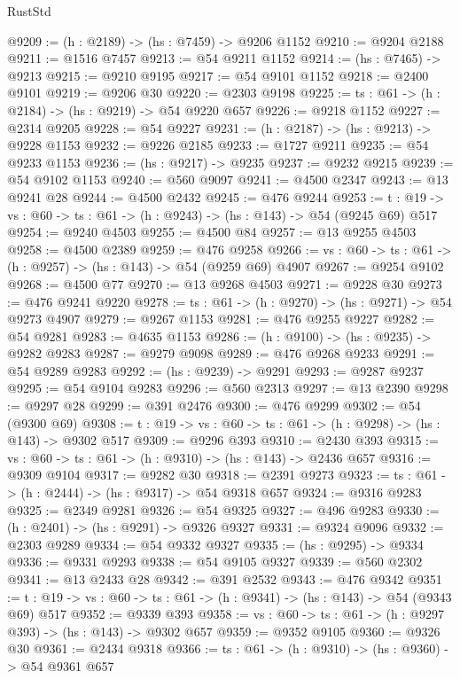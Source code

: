 \begin{lexlean}{RustStd}
\begin{coremodule}
@9209 := (h : @2189) -> (hs : @7459) -> @9206 @1152
@9210 := @9204 @2188
@9211 := @1516 @7457
@9213 := @54 @9211 @1152
@9214 := (hs : @7465) -> @9213
@9215 := @9210 @9195
@9217 := @54 @9101 @1152
@9218 := @2400 @9101
@9219 := @9206 @30
@9220 := @2303 @9198
@9225 := {ts : @61} -> (h : @2184) -> (hs : @9219) -> @54 @9220 @657
@9226 := @9218 @1152
@9227 := @2314 @9205
@9228 := @54 @9227
@9231 := (h : @2187) -> (hs : @9213) -> @9228 @1153
@9232 := @9226 @2185
@9233 := @1727 @9211
@9235 := @54 @9233 @1153
@9236 := (hs : @9217) -> @9235
@9237 := @9232 @9215
@9239 := @54 @9102 @1153
@9240 := @560 @9097
@9241 := @4500 @2347
@9243 := @13 @9241 @28
@9244 := @4500 @2432
@9245 := @476 @9244
@9253 := {t : @19} -> {vs : @60} -> {ts : @61} -> (h : @9243) -> (hs : @143) -> @54 (@9245 @69) @517
@9254 := @9240 @4503
@9255 := @4500 @84
@9257 := @13 @9255 @4503
@9258 := @4500 @2389
@9259 := @476 @9258
@9266 := {vs : @60} -> {ts : @61} -> (h : @9257) -> (hs : @143) -> @54 (@9259 @69) @4907
@9267 := @9254 @9102
@9268 := @4500 @77
@9270 := @13 @9268 @4503
@9271 := @9228 @30
@9273 := @476 @9241 @9220
@9278 := {ts : @61} -> (h : @9270) -> (hs : @9271) -> @54 @9273 @4907
@9279 := @9267 @1153
@9281 := @476 @9255 @9227
@9282 := @54 @9281
@9283 := @4635 @1153
@9286 := (h : @9100) -> (hs : @9235) -> @9282 @9283
@9287 := @9279 @9098
@9289 := @476 @9268 @9233
@9291 := @54 @9289 @9283
@9292 := (hs : @9239) -> @9291
@9293 := @9287 @9237
@9295 := @54 @9104 @9283
@9296 := @560 @2313
@9297 := @13 @2390
@9298 := @9297 @28
@9299 := @391 @2476
@9300 := @476 @9299
@9302 := @54 (@9300 @69)
@9308 := {t : @19} -> {vs : @60} -> {ts : @61} -> (h : @9298) -> (hs : @143) -> @9302 @517
@9309 := @9296 @393
@9310 := @2430 @393
@9315 := {vs : @60} -> {ts : @61} -> (h : @9310) -> (hs : @143) -> @2436 @657
@9316 := @9309 @9104
@9317 := @9282 @30
@9318 := @2391 @9273
@9323 := {ts : @61} -> (h : @2444) -> (hs : @9317) -> @54 @9318 @657
@9324 := @9316 @9283
@9325 := @2349 @9281
@9326 := @54 @9325
@9327 := @496 @9283
@9330 := (h : @2401) -> (hs : @9291) -> @9326 @9327
@9331 := @9324 @9096
@9332 := @2303 @9289
@9334 := @54 @9332 @9327
@9335 := (hs : @9295) -> @9334
@9336 := @9331 @9293
@9338 := @54 @9105 @9327
@9339 := @560 @2302
@9341 := @13 @2433 @28
@9342 := @391 @2532
@9343 := @476 @9342
@9351 := {t : @19} -> {vs : @60} -> {ts : @61} -> (h : @9341) -> (hs : @143) -> @54 (@9343 @69) @517
@9352 := @9339 @393
@9358 := {vs : @60} -> {ts : @61} -> (h : @9297 @393) -> (hs : @143) -> @9302 @657
@9359 := @9352 @9105
@9360 := @9326 @30
@9361 := @2434 @9318
@9366 := {ts : @61} -> (h : @9310) -> (hs : @9360) -> @54 @9361 @657

\end{coremodule}
\end{lexlean}
